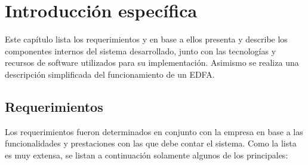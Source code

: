 \chapter{Introducción específica} %

\label{Chapter2}


Este capítulo lista los requerimientos y en base a ellos presenta y describe los componentes internos del sistema desarrollado, junto con las tecnologías y recursos de software utilizados para su implementación. Asimismo se realiza una descripción simplificada del funcionamiento de un EDFA.

\section{Requerimientos}
\label{sec:reqs}

Los requerimientos fueron determinados en conjunto con la empresa en base a las funcionalidades y prestaciones con las que debe contar el sistema. Como la lista es muy extensa, se listan a continuación solamente algunos de los principales:

\renewcommand{\labelenumii}{\arabic{enumi}.\arabic{enumii}}

